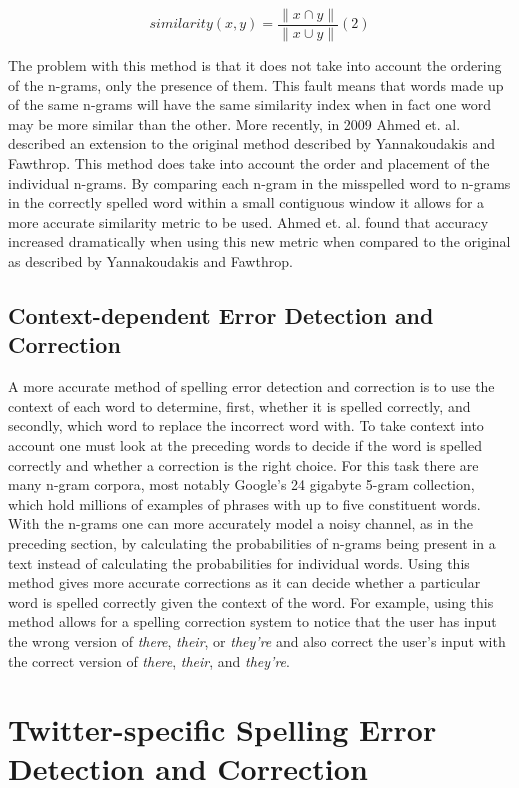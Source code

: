 \[
similarity(x,y) = \frac{\|x \cap y \|}{\|x \cup y \|} (2)
\]

The problem with this method is that it does not take into account the ordering of the n-grams, only the presence of them. This fault means that words made up of the same n-grams will have the same similarity index when in fact one word may be more similar than the other. More recently, in 2009 Ahmed et. al. described an extension to the original method described by Yannakoudakis and Fawthrop. This method does take into account the order and placement of the individual n-grams. By comparing each n-gram in the misspelled word to n-grams in the correctly spelled word within a small contiguous window it allows for a more accurate similarity metric to be used. Ahmed et. al. found that accuracy increased dramatically when using this new metric when compared to the original as described by Yannakoudakis and Fawthrop.

\subsection{Context-dependent Error Detection and Correction}

A more accurate method of spelling error detection and correction is to use the context of each word to determine, first, whether it is spelled correctly, and secondly, which word to replace the incorrect word with. To take context into account one must look at the preceding words to decide if the word is spelled correctly and whether a correction is the right choice. For this task there are many n-gram corpora, most notably Google's 24 gigabyte 5-gram collection, which hold millions of examples of phrases with up to five constituent words. With the n-grams one can more accurately model a noisy channel, as in the preceding section, by calculating the probabilities of n-grams being present in a text instead of calculating the probabilities for individual words. Using this method gives more accurate corrections as it can decide whether a particular word is spelled correctly given the context of the word. For example, using this method allows for a spelling correction system to notice that the user has input the wrong version of \emph{there}, \emph{their}, or \emph{they're} and also correct the user's input with the correct version of \emph{there}, \emph{their}, and \emph{they're}.

\section{Twitter-specific Spelling Error Detection and Correction}

